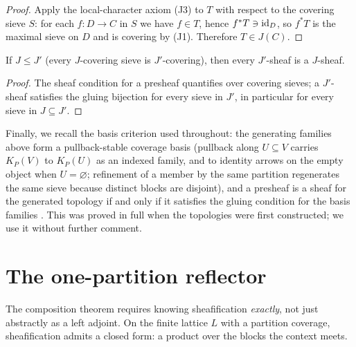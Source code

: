 \begin{proof}
Apply the local-character axiom (J3) to $T$ with respect to the covering sieve
$S$: for each $f : D \to C$ in $S$ we have $f \in T$, hence
$f^{*}T \ni \mathrm{id}_D$, so $f^{*}T$ is the maximal sieve on $D$ and is covering by
(J1). Therefore $T \in J(C)$.
\end{proof}

\begin{lemma}
\label{ch10:lem:coarser}
If $J \le J'$ (every $J$-covering sieve is $J'$-covering), then every
$J'$-sheaf is a $J$-sheaf.
\end{lemma}

\begin{proof}
The sheaf condition for a presheaf quantifies over covering sieves; a
$J'$-sheaf satisfies the gluing bijection for every sieve in $J'$, in
particular for every sieve in $J \subseteq J'$.
\end{proof}

Finally, we recall the basis criterion used throughout: the generating families
above form a pullback-stable coverage basis (pullback along $U \subseteq V$
carries $K_P(V)$ to $K_P(U)$ as an indexed family, and to identity arrows on
the empty object when $U = \varnothing$; refinement of a member by the same
partition regenerates the same sieve because distinct blocks are disjoint), and
a presheaf is a sheaf for the generated topology if and only if it satisfies
the gluing condition for the basis families \cite{stacks00ZC}. This was proved
in full when the topologies were first constructed; we use it without further
comment.

\section{The one-partition reflector}
\label{ch10:sec:reflector}

The composition theorem requires knowing sheafification \emph{exactly}, not
just abstractly as a left adjoint. On the finite lattice $L$ with a partition
coverage, sheafification admits a closed form: a product over the blocks the
context meets.

